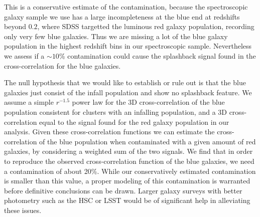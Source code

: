 \documentclass[iop, apjl, twocolappendix, numberedappendix]{emulateapj}
\begin{document}
This is a conservative estimate of the contamination, because the
spectroscopic galaxy sample we use has a large incompleteness at the
blue end at redshifts beyond $0.2$, where SDSS targetted the luminous
red galaxy population, recording only very few blue galaxies. 
Thus we are missing a lot of the blue galaxy
population in the highest redshift bins in our spectroscopic sample.
Nevertheless we assess if a $\sim 10$\% contamination could
cause the splashback signal found in the cross-correlation for the blue galaxies.


The null hypothesis that we would like to establish or rule out is
that the blue galaxies just consist of the infall population and show
no splashback feature. We assume a simple $r^{-1.5}$ power law for the
3D cross-correlation of the blue population consistent for clusters with
an infalling population, and a 3D cross-correlation equal to the signal
found for the red galaxy population in our analysis. Given these
cross-correlation functions we can estimate the cross-correlation of
the blue population when contaminated with a given amount of red
galaxies, by considering a weighted sum of the two signals. 
We find that in order to reproduce the observed
cross-correlation function of the blue galaxies, we need a contamination
of about 20\%. While our conservatively estimated contamination is
smaller than this value, a proper modeling of this contamination is
warranted before definitive conclusions can be drawn. Larger galaxy
surveys with better photometry such as the HSC or LSST would be of
significant help in alleviating these issues.



\label{lastpage}
\end{document}
